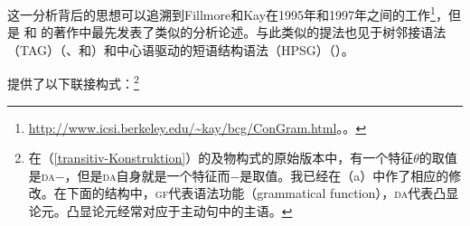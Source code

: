 这一分析背后的思想可以追溯到Fillmore和Kay在1995年和1997年之间的工作\footnote{%
\url{http://www.icsi.berkeley.edu/~kay/bcg/ConGram.html}。。
}，但是 和 的著作中最先发表了类似的分析论述。与此类似的提法也见于树邻接语法\indextag（TAG）（\citealp{Candito96a}、\citealp[]{CK2003a-u}和\citealp[--172]{KO2012a}）和中心语驱动的短语结构语法\indexhpsg（HPSG）（\citealp{Koenig99a,DK2000b-u,Kordoni2001b-u}）。

 \citet[--57]{MR2001a}提供了以下联接构式：\footnote{%
	在（\ref{transitiv-Konstruktion}）的及物构式的原始版本中，有一个特征$\theta$的取值是\textsc{da}$-$，但是\textsc{da}自身就是一个特征而$-$是取值。我已经在（a）中作了相应的修改。在下面的结构中，\textsc{gf}代表语法功能（grammatical function），\textsc{da}代表凸显论元。凸显论元经常对应于主动句中的主语。}
	
